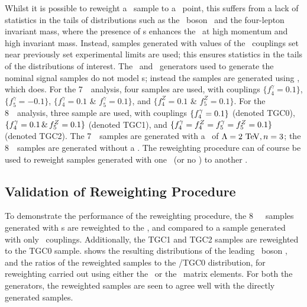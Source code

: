 Whilst it is possible to reweight a \sm\ sample to a \TGC\ point, this suffers
from a lack of statistics in the tails of distributions such as the \Z\ boson \pt\ 
and the four-lepton invariant mass, where the presence of \TGC s
enhances the \cx\ at high momentum and high invariant mass. Instead,
samples generated with values of the \TGC\ couplings set near previously set
experimental limits are used; this ensures statistics in the tails of the
distributions of interest. The \powhegbox\ and \ggZZ\ generators used to generate the nominal signal
samples do not model \TGC s; instead the samples are generated using \sherpa,
which does. For the 7~\tev\ analysis, four samples are used, with couplings
 $\{f_{4}^{\gamma}=0.1\}$, $\{f_{5}^{\gamma}=-0.1\}$,
$\{f_{4}^{\gamma}=0.1$ \& $f_{5}^{\gamma}=0.1\}$, and 
$\{f_{4}^{Z}=0.1$ \& $f_5^{Z}=0.1\}$. For the 8~\tev\ analysis, three sample are
used, with couplings $\{f_{4}^{\gamma}=0.1\}$ (denoted TGC0),
$\{f_{4}^{\gamma}=0.1 \,\&\, f_{5}^{Z}=0.1\}$ (denoted TGC1), and 
$\{ f_{4}^{\gamma} = f_{4}^{Z} = f_{5}^{\gamma} = f_{5}^{Z} = 0.1 \}$ (denoted TGC2). The 7~\tev\ samples are
generated with a \formfactor\ of $\Lambda=2\tev,n=3$; the 8~\tev\ samples are
generated without a \formfactor. The reweighting procedure can of course be used to
reweight samples generated with one \formfactor\ (or no \formfactor) to another
\formfactor.

\subsection{Validation of Reweighting Procedure}

To demonstrate the performance of the reweighting procedure, the 8~\tev\ \sherpa\
samples generated with \TGC s are reweighted to the \sm, and
compared to a sample generated with only \sm\ couplings. Additionally, the TGC1 and TGC2
samples are reweighted to the TGC0 sample. \fig{TGC-reweight} shows the
resulting distributions of the leading \Z\ boson \pt, and the ratios of
the reweighted samples to the \sm/TGC0 distribution, for reweighting carried out
using either the \BHO\ or the \BR\ matrix elements. For both the generators, the reweighted samples are seen
to agree well with the directly generated samples.

